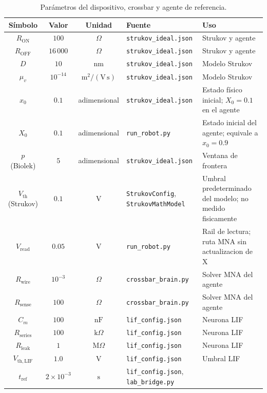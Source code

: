 \begin{table}[H]
\centering
\small
\caption{Parámetros del dispositivo, crossbar y agente de referencia.}
\label{tab:parametros_modelo}
\begin{tabularx}{\textwidth}{c c c X X}
\hline
\textbf{Símbolo} & \textbf{Valor} & \textbf{Unidad} &
\textbf{Fuente} & \textbf{Uso} \\
\hline
$R_{\mathrm{ON}}$ & $100$ & $\Omega$ &
\texttt{strukov\_ideal.json} & Strukov y agente \\
$R_{\mathrm{OFF}}$ & $16\,000$ & $\Omega$ &
\texttt{strukov\_ideal.json} & Strukov y agente \\
$D$ & $10$ & $\mathrm{nm}$ &
\texttt{strukov\_ideal.json} & Modelo Strukov \\
$\mu_v$ & $10^{-14}$ & $\mathrm{m^2/(V\,s)}$ &
\texttt{strukov\_ideal.json} & Modelo Strukov \\
$x_0$ & $0.1$ & adimensional &
\texttt{strukov\_ideal.json} & Estado físico inicial; $X_0=0.1$ en el agente \\
$X_0$ & $0.1$ & adimensional &
\texttt{run\_robot.py} & Estado inicial del agente; equivale a $x_0=0.9$ \\
$p$ (Biolek) & $5$ & adimensional &
\texttt{strukov\_ideal.json} & Ventana de frontera \\
$V_{\mathrm{th}}$ (Strukov) & $0.1$ & $\mathrm{V}$ &
\texttt{StrukovConfig}, \texttt{StrukovMathModel} &
Umbral predeterminado del modelo; no medido fisicamente \\
$V_{\mathrm{read}}$ & $0.05$ & $\mathrm{V}$ &
\texttt{run\_robot.py} & Rail de lectura; ruta MNA sin actualizacion de X \\
$R_{\mathrm{wire}}$ & $10^{-3}$ & $\Omega$ &
\texttt{crossbar\_brain.py} & Solver MNA del agente \\
$R_{\mathrm{sense}}$ & $100$ & $\Omega$ &
\texttt{crossbar\_brain.py} & Solver MNA del agente \\
$C_m$ & $100$ & $\mathrm{nF}$ &
\texttt{lif\_config.json} & Neurona LIF \\
$R_{\mathrm{series}}$ & $100$ & $\mathrm{k}\Omega$ &
\texttt{lif\_config.json} & Neurona LIF \\
$R_{\mathrm{leak}}$ & $1$ & $\mathrm{M}\Omega$ &
\texttt{lif\_config.json} & Neurona LIF \\
$V_{\mathrm{th,LIF}}$ & $1.0$ & $\mathrm{V}$ &
\texttt{lif\_config.json} & Umbral LIF \\
$t_{\mathrm{ref}}$ & $2\times10^{-3}$ & $\mathrm{s}$ &
\texttt{lif\_config.json}, \texttt{lab\_bridge.py} &

\end{tabularx}
\end{table}
